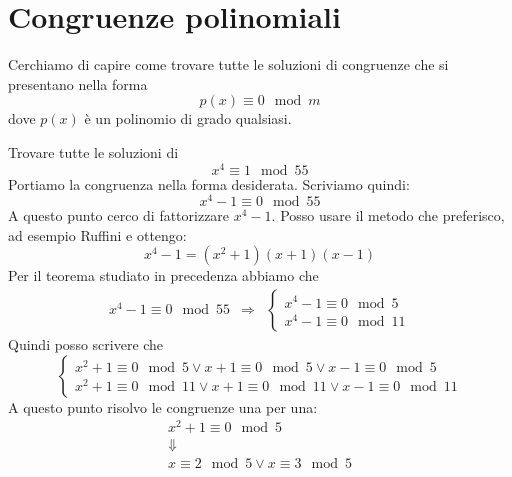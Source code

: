 \section{Congruenze polinomiali}
Cerchiamo di capire come trovare tutte le soluzioni di congruenze che si presentano nella forma
\begin{equation*}
	p(x) \equiv 0 \mod{m}
\end{equation*}
dove $p(x)$ \`e un polinomio di grado qualsiasi.

\begin{example}
	Trovare tutte le soluzioni di
	\begin{equation*}
		x^4 \equiv 1 \mod{55}
	\end{equation*}
	Portiamo la congruenza nella forma desiderata. Scriviamo quindi:
	\begin{equation*}
		x^4 - 1 \equiv 0 \mod{55}
	\end{equation*}
	A questo punto cerco di fattorizzare $x^4 - 1$. Posso usare il metodo che preferisco, ad
	esempio Ruffini e ottengo:
	\begin{equation*}
		x^4 - 1 = (x^2 + 1)(x + 1)(x - 1)
	\end{equation*}
	Per il teorema studiato in precedenza abbiamo che
	\begin{equation*}
		\begin{array}{rcl}
			x^4 - 1 \equiv 0 \mod{55} &
			\Rightarrow               &
			\begin{cases}
				x^4 - 1 \equiv 0 \mod{5} \\
				x^4 - 1 \equiv 0 \mod{11}
			\end{cases}
		\end{array}
	\end{equation*}
	Quindi posso scrivere che
	\begin{equation*}
		\begin{cases}
			x^2 + 1 \equiv 0 \mod{5} \vee x + 1 \equiv 0 \mod{5} \vee x - 1 \equiv 0 \mod{5} \\
			x^2 + 1 \equiv 0 \mod{11} \vee x + 1 \equiv 0 \mod{11} \vee x - 1 \equiv 0 \mod{11}
		\end{cases}
	\end{equation*}
	A questo punto risolvo le congruenze una per una:
	\begin{equation*}
		\begin{array}{c}
			x^2 + 1 \equiv 0 \mod{5}                   \\
			\Downarrow                                 \\
			x \equiv 2 \mod{5} \vee x \equiv 3 \mod{5} \\

\end{array}
\end{equation*}
\end{example}
